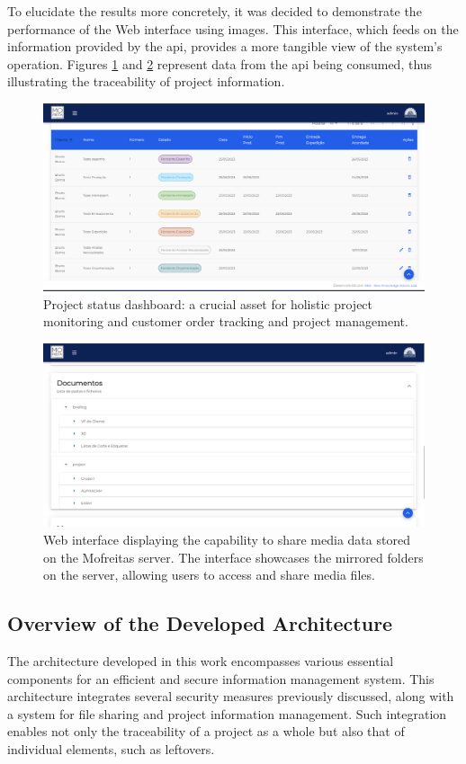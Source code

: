 To elucidate the results more concretely, it was decided to demonstrate the performance of the Web interface using images. This interface, which feeds on the information provided by the \gls{api}, provides a more tangible view of the system's operation. Figures \ref{fig:results-dash1} and \ref{fig:results-dash3} represent data from the \gls{api} being consumed, thus illustrating the traceability of project information.

\begin{figure}[H]
    \centering
    \includegraphics[width=0.65\linewidth]{images/chap5/dashboard02.png}
    \caption{Project status dashboard: a crucial asset for holistic project monitoring and customer order tracking and project management.}
    \label{fig:results-dash1}
\end{figure}


\begin{figure}[!ht]
    \centering
    \includegraphics[width=0.65\linewidth]{images/chap5/dashboard03.png}
    \caption{Web interface displaying the capability to share media data stored on the Mofreitas server. The interface showcases the mirrored folders on the server, allowing users to access and share media files.}
    \label{fig:results-dash3}
\end{figure}


\subsection{Overview of the Developed Architecture}

The architecture developed in this work encompasses various essential components for an efficient and secure information management system. This architecture integrates several security measures previously discussed, along with a system for file sharing and project information management. Such integration enables not only the traceability of a project as a whole but also that of individual elements, such as leftovers.

